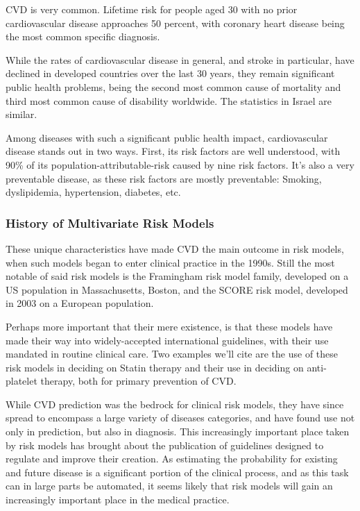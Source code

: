 \documentclass[a4paper,12pt]{article}
\begin{document}
			CVD is very common. Lifetime risk for people aged 30 with no prior cardiovascular disease approaches 50 percent\cite{Rapsomaniki2014}, with coronary heart disease being the most common specific diagnosis\cite{Benjamin2017}.
	
			While the rates of cardiovascular disease in general, and stroke in particular, have declined in developed countries over the last 30 years\cite{Koton2014,Vangen-Loenne2017}, they remain significant public health problems, being the second most common cause of mortality and third most common cause of disability worldwide\cite{Lozano2012}. The statistics in Israel are similar\cite{ICDC2017}.
			
			Among diseases with such a significant public health impact, cardiovascular disease stands out in two ways. First, its risk factors are well understood, with 90\% of its population-attributable-risk caused by nine risk factors. It's also a very preventable disease, as these risk factors are mostly preventable\cite{Yusuf2004,ODonnell2016}: Smoking, dyslipidemia, hypertension, diabetes, etc.
			
			\subsubsection{History of Multivariate Risk Models}
		
			These unique characteristics have made CVD the main outcome in risk models, when such models began to enter clinical practice in the 1990s\cite{Wilson1998,NationalCholesterolEducationProgramNCEPExpertPanelonDetection2002,Conroy2003,Hippisley-Cox2007,DAgostino2008,Hippisley-Cox2008,Goff2014}. Still the most notable of said risk models is the Framingham risk model family, developed on a US population in Massachusetts, Boston\cite{Wilson1998}, and the SCORE risk model, developed in 2003 on a European population\cite{Conroy2003}.
			
			Perhaps more important that their mere existence, is that these models have made their way into widely-accepted international guidelines, with their use mandated in routine clinical care. Two examples we'll cite are the use of these risk models in deciding on Statin therapy\cite{Goff2014} and their use in deciding on anti-platelet therapy\cite{Bibbins-Domingo2016}, both for primary prevention of CVD.
			
			While CVD prediction was the bedrock for clinical risk models, they have since spread to encompass a large variety of diseases categories\cite{Kanis2008,Kansagara2011}, and have found use not only in prediction, but also in diagnosis\cite{Usher-Smith2016}. This increasingly important place taken by risk models has brought about the publication of guidelines designed to regulate and improve their creation\cite{Collins2015}. As estimating the probability for existing and future disease is a significant portion of the clinical process\cite{Moons2009}, and as this task can in large parts be automated, it seems likely that risk models will gain an increasingly important place in the medical practice.
			
\end{document}
